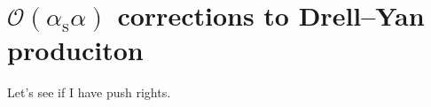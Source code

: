 \documentclass{scrartcl}
\begin{document}
\section{\(\mathcal{O}(\alpha_\mathrm{s}\alpha)\) corrections to Drell--Yan produciton}

Let's see if I have push rights.
\end{document}
